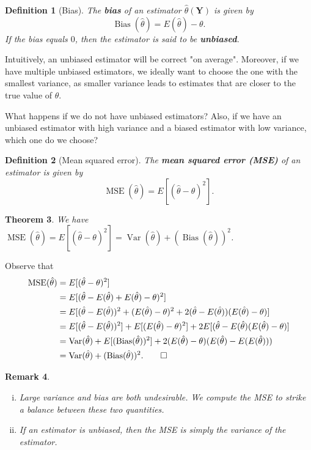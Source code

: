 \documentclass[10pt]{article}
\makeatletter
\DeclareMathOperator{\Var}{Var}
\DeclareMathOperator{\Bias}{Bias}
\DeclareMathOperator{\MSE}{MSE}
\theoremstyle{newstyle}
\newtheorem{thm}{Theorem}[section]
\newtheorem{remark}[thm]{Remark}
\newtheorem{defn}[thm]{Definition}
\newenvironment{pf}[1][\proofname]{\par
  \pushQED{\qed}%
  \normalfont \topsep0\p@\relax
  \trivlist
  \item[\hskip\labelsep\scshape
  #1\@addpunct{.}]\ignorespaces
}{%
  \popQED\endtrivlist\@endpefalse
}
\makeatother
\begin{document}
\begin{defn}[Bias]
The {\bf bias} of an estimator $\hat\theta(\mathbf Y)$ is given by 
\[ \Bias(\hat\theta) = E(\hat\theta) - \theta. \]
If the bias equals $0$, then the estimator is said to be {\bf unbiased}.
\end{defn}

Intuitively, an unbiased estimator will be correct "on average". Moreover, if we have multiple 
unbiased estimators, we ideally want to choose the one with the smallest variance, 
as smaller variance leads to estimates that are closer to the true value of $\theta$. 

What happens if we do not have unbiased estimators? Also, if we have an unbiased estimator 
with high variance and a biased estimator with low variance, which one do we choose?

\begin{defn}[Mean squared error]
The {\bf mean squared error (MSE)} of an estimator is given by 
\[ \MSE(\hat\theta) = E[(\hat\theta - \theta)^2]. \]
\end{defn}

\begin{thm}
We have $\MSE(\hat\theta) = E[(\hat\theta - \theta)^2] = \Var(\hat\theta) + (\Bias(\hat\theta))^2$. 
\end{thm}
\begin{pf}
Observe that 
\begin{align*}
    \MSE(\hat\theta) &= E[(\hat\theta - \theta)^2] \\
    &= E[(\hat\theta - E(\hat\theta) + E(\hat\theta) - \theta)^2] \\
    &= E[(\hat\theta - E(\hat\theta))^2 + (E(\hat\theta) - \theta)^2 + 
    2(\hat\theta - E(\hat\theta))(E(\hat\theta) - \theta)] \\
    &= E[(\hat\theta - E(\hat\theta))^2] + E[(E(\hat\theta) - \theta)^2] 
    + 2E[(\hat\theta - E(\hat\theta)(E(\hat\theta) - \theta)] \\
    &= \Var(\hat\theta) + E[(\Bias(\hat\theta))^2] + 2(E(\hat\theta) - \theta) (E(\hat\theta) 
    - E(E(\hat\theta))) \\
    &= \Var(\hat\theta) + (\Bias(\hat\theta))^2. \qedhere 
\end{align*}
\end{pf}

\begin{remark}~
\begin{enumerate}[(i)]
    \item Large variance and bias are both undesirable. We compute the MSE to strike a 
    balance between these two quantities. 
    \item If an estimator is unbiased, then the MSE is simply the variance of the estimator. 
\end{enumerate}
\end{remark}
\end{document}
